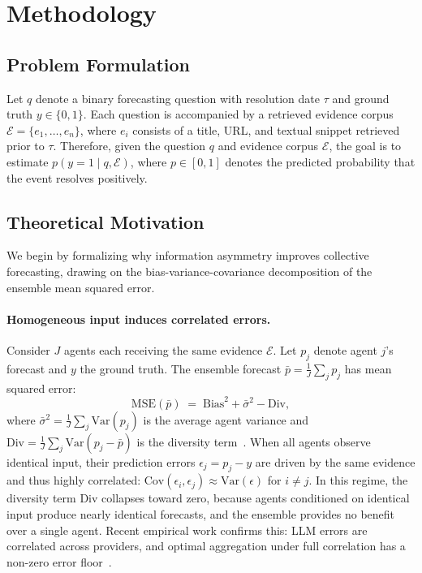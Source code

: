 \documentclass[11pt]{article}
\theoremstyle{plain}
\theoremstyle{definition}
\begin{document}
\section{Methodology}
\label{sec:method}

\subsection{Problem Formulation}

Let $q$ denote a binary forecasting question with resolution date $\tau$ and ground truth $y \in \{0,1\}$.
Each question is accompanied by a retrieved evidence corpus
$\mathcal{E} = \{e_1, \dots, e_n\}$, where $e_i$ consists of a title, URL, and textual snippet retrieved prior to $\tau$.
Therefore, given the question $q$ and evidence corpus $\mathcal{E}$, the goal is to estimate
$p(y = 1 \mid q, \mathcal{E})$,
where $p \in [0,1]$ denotes the predicted probability that the event resolves positively.


\subsection{Theoretical Motivation}
\label{sec:theory}

We begin by formalizing why information asymmetry improves collective forecasting, drawing on the bias-variance-covariance decomposition of the ensemble mean squared error.

\paragraph{Homogeneous input induces correlated errors.}
Consider $J$ agents each receiving the same evidence $\mathcal{E}$.
Let $p_j$ denote agent $j$'s forecast and $y$ the ground truth.
The ensemble forecast $\bar{p} = \frac{1}{J}\sum_j p_j$ has mean squared error:
\begin{equation}
  \mathrm{MSE}(\bar{p}) \;=\; \mathrm{Bias}^2 + \bar{\sigma}^2 - \mathrm{Div},
  \label{eq:bvd}
\end{equation}
where $\bar{\sigma}^2 = \frac{1}{J}\sum_j \mathrm{Var}(p_j)$ is the average agent variance and $\mathrm{Div} = \frac{1}{J}\sum_j \mathrm{Var}(p_j - \bar{p})$ is the diversity term~\citep{wood2023unified}.
When all agents observe identical input, their prediction errors $\epsilon_j = p_j - y$ are driven by the same evidence and thus highly correlated: $\mathrm{Cov}(\epsilon_i, \epsilon_j) \approx \mathrm{Var}(\epsilon)$ for $i \neq j$.
In this regime, the diversity term $\mathrm{Div}$ collapses toward zero, because agents conditioned on identical input produce nearly identical forecasts, and the ensemble provides no benefit over a single agent.
Recent empirical work confirms this: LLM errors are correlated across providers, and optimal aggregation under full correlation has a non-zero error floor~\citep{kim2025correlated,turkmen2026don}.
\end{document}
